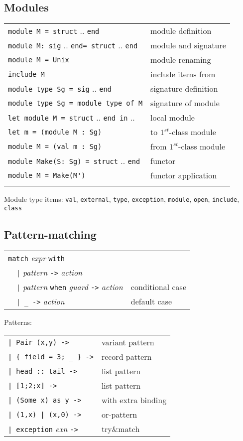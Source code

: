 \documentclass[10pt,landscape]{article}
\begin{document}
\begin{multicols}{3}
{\subsection{Modules}

\begin{tabular}{ll}
\verb!module M = struct! .. \verb!end! & module definition\\
\verb!module M: sig! .. \verb!end= struct! .. \verb!end! & module and signature\\
\verb!module M = Unix! & module renaming \\
\verb!include M! & include items from \\
\verb!module type Sg = sig! .. \verb!end! & signature definition\\
\verb!module type Sg = module type of M! & signature of module\\
\verb!let module M = struct! .. \verb!end in! ..  & local module \\
\verb!let m = (module M : Sg)! & to $1^{st}$-class module\\
\verb!module M = (val m : Sg)! & from $1^{st}$-class module\\
\verb!module Make(S: Sg) = struct! .. \verb!end! & functor \\
\verb!module M = Make(M')! & functor application \\
& \\
\end{tabular}

Module type items: \verb!val!, \verb!external!, \verb!type!, \verb!exception!, \verb!module!, \verb!open!, \verb!include!, \verb!class!

\subsection{Pattern-matching}

\begin{tabular}{ll}
\verb!match! \emph{expr} \verb!with! \\
\verb!  |! \emph{pattern} \verb!->! \emph{action}\\
\verb!  |! \emph{pattern} \verb!when! \emph{guard} \verb!->! \emph{action}
& conditional case \\
\verb!  | _ ->! \emph{action} & default case\\
\end{tabular}
Patterns:\\
\begin{tabular}{ll}
\verb!| Pair (x,y) ->! & variant pattern \\
\verb!| { field = 3; _ } ->! & record pattern \\
\verb!| head :: tail ->! & list pattern \\
\verb!| [1;2;x] ->! & list pattern \\
\verb!| (Some x) as y ->! & with extra binding \\
\verb!| (1,x) | (x,0) ->! & or-pattern \\
\verb!| exception! \emph{exn} \verb!->! & try\&match \\
\end{tabular}
}


\end{multicols}
\end{document}

